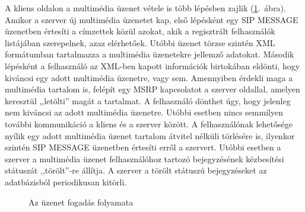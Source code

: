 A kliens oldalon a multimédia üzenet vétele is több lépésben zajlik (\ref{fig:receiving_proc}.~ábra). Amikor a szerver új multimédia üzenetet kap, első lépésként egy SIP MESSAGE üzenetben értesíti a címzettek közül azokat, akik a regisztrált felhasználók listájában szerepelnek, azaz elérhetőek. Utóbbi üzenet törzse szintén XML formátumban tartalmazza a multimédia üzenetekre jellemző adatokat. Második lépésként a felhasználó az XML-ben kapott információk birtokában eldönti, hogy kiváncsi egy adott multimédia üzenetre, vagy sem. Amennyiben érdekli maga a multimédia tartalom is, felépít egy MSRP kapcsolatot a szerver oldallal, amelyen keresztül ,,letölti'' magát a tartalmat. A felhasználó dönthet úgy, hogy jelenleg nem kiváncsi az adott multimédia üzenetre. Utóbbi esetben nincs semmilyen további kommunikáció a kliens és a szerver között. A felhasználónak lehetősége nyílik egy adott multimédia üzenet tartalom átvitel nélküli törlésére is, ilyenkor szintén SIP MESSAGE üzenetben értesíti erről a szervert. Utóbbi esetben a szerver a multimédia üzenet felhasználóhoz tartozó bejegyzésének kézbesítési státuszát ,,törölt''-re állítja. A szerver a törölt státuszú bejegyzéseket az adatbázisból periodikusan kitörli.

\begin{figure}[htbp]
\center
{}
\caption{Az üzenet fogadás folyamata}
\label{fig:receiving_proc}
\end{figure}

